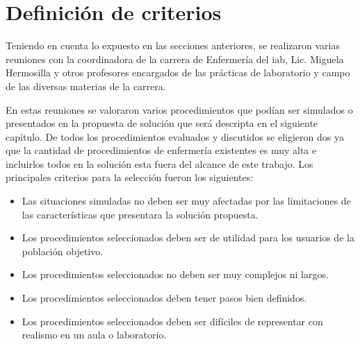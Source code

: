 \section{Definición de criterios}
\label{sec:definicion_criterios}

Teniendo en cuenta lo expuesto en las secciones anteriores, se realizaron varias reuniones con la coordinadora de la carrera de Enfermería del \Gls{iab}, Lic. Miguela Hermosilla y otros profesores encargados de las
prácticas de laboratorio y campo de las diversas materias de la carrera.

En estas reuniones se valoraron varios procedimientos que podían ser simulados o presentados en la
propuesta de solución que será descripta en el siguiente capítulo. De todos los procedimientos evaluados
y discutidos se eligieron dos ya que la cantidad de procedimientos de enfermería existentes es muy alta e incluirlos todos en la solución esta fuera del alcance de este trabajo. Los principales criterios para la selección fueron los siguientes:

\begin{itemize}
\item Las situaciones simuladas no deben ser muy afectadas por las limitaciones de las 
características que presentara la solución propuesta.
\item Los procedimientos seleccionados deben ser de utilidad para los usuarios de la población objetivo.
\item Los procedimientos seleccionados no deben ser muy complejos ni largos.
\item Los procedimientos seleccionados deben tener pasos bien definidos.
\item Los procedimientos seleccionados deben ser difíciles de representar con realismo en un aula o laboratorio.
\end{itemize}


